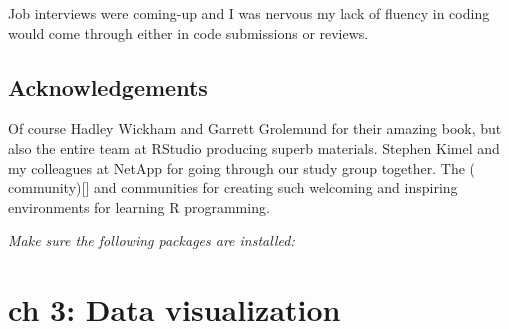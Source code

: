 \documentclass[]{book}
\theoremstyle{definition}
\theoremstyle{definition}
\theoremstyle{definition}
\theoremstyle{remark}
\begin{document}
Job interviews were coming-up and I was nervous my lack of fluency in
coding would come through either in code submissions or reviews.

\hypertarget{acknowledgements}{%
\section{Acknowledgements}\label{acknowledgements}}

Of course Hadley Wickham and Garrett Grolemund for their amazing book,
but also the entire team at RStudio producing superb materials. Stephen
Kimel and my colleagues at NetApp for going through our study group
together. The (\citet{R4DS} community){[}{]} and \citet{rstats}
communities for creating such welcoming and inspiring environments for
learning R programming.

\emph{Make sure the following packages are installed:}

\hypertarget{ch-3-data-visualization}{%
\chapter{ch 3: Data visualization}\label{ch-3-data-visualization}}
\end{document}
